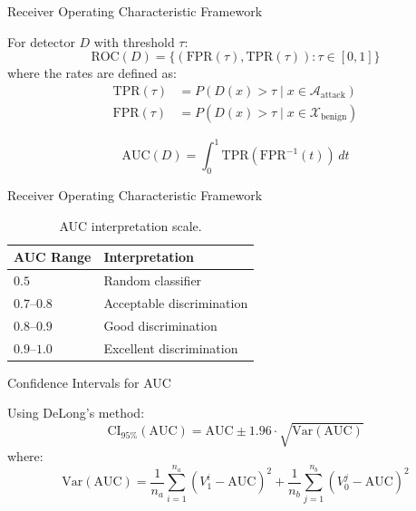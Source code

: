 \documentclass[
  ignorenonframetext,
]{beamer}
\begin{document}
\begin{frame}[allowframebreaks]{Receiver Operating Characteristic
Framework}
\protect{}\label{receiver-operating-characteristic-framework}
\begin{definition}
\label{def:roc-curve}
For detector $D$ with threshold $\tau$:
\begin{equation}
\label{eq:roc-curve}
\text{ROC}(D) = \{(\text{FPR}(\tau), \text{TPR}(\tau)) : \tau \in [0, 1]\}
\end{equation}
where the rates are defined as:
\begin{align}
\label{eq:tpr}
\text{TPR}(\tau) &= P(D(x) > \tau \mid x \in \mathcal{A}_{\text{attack}}) \\
\label{eq:fpr}
\text{FPR}(\tau) &= P(D(x) > \tau \mid x \in \mathcal{X}_{\text{benign}})
\end{align}
\end{definition}

\begin{definition}
\label{def:auc}
\begin{equation}
\label{eq:auc}
\text{AUC}(D) = \int_0^1 \text{TPR}(\text{FPR}^{-1}(t)) \, dt
\end{equation}
\end{definition}

\end{frame}

\begin{frame}[allowframebreaks]{Receiver Operating Characteristic
Framework}
\begin{table}[htbp]
\centering
\caption{AUC interpretation scale.}
\label{tab:auc-interpretation}
\begin{tabular}{@{}ll@{}}
\toprule
AUC Range & Interpretation \\
\midrule
$0.5$ & Random classifier \\
$0.7$--$0.8$ & Acceptable discrimination \\
$0.8$--$0.9$ & Good discrimination \\
$0.9$--$1.0$ & Excellent discrimination \\
\bottomrule
\end{tabular}
\end{table}
\end{frame}

\begin{frame}[allowframebreaks]{Confidence Intervals for AUC}
\protect{}\label{confidence-intervals-for-auc}
\begin{definition}
\label{def:auc-ci}
Using DeLong's method:
\begin{equation}
\label{eq:auc-ci}
\text{CI}_{95\%}(\text{AUC}) = \text{AUC} \pm 1.96 \cdot \sqrt{\text{Var}(\text{AUC})}
\end{equation}
where:
\begin{equation}
\label{eq:auc-variance}
\text{Var}(\text{AUC}) = \frac{1}{n_a} \sum_{i=1}^{n_a} (V_1^i - \text{AUC})^2 + \frac{1}{n_b} \sum_{j=1}^{n_b} (V_0^j - \text{AUC})^2
\end{equation}
\end{definition}
\end{frame}
\end{document}
